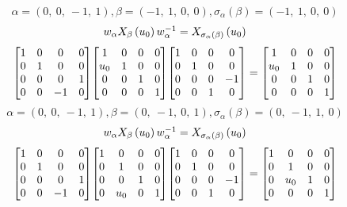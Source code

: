 \documentclass[11pt]{article}
\theoremstyle{definition}
\begin{document}
\[
\alpha = \left( 0, \  0, \  -1, \  1\right), \beta = \left( -1, \  1, \  0, \  0\right), \sigma_{\alpha}(\beta) = \left( -1, \  1, \  0, \  0\right)
\]
\[
\scaletoalign{\textwidth}{w_{\alpha} X_{\beta}\left(u_{0}\right) w_{\alpha}^{-1} = X_{\sigma_{\alpha}\left(\beta\right)}\left(u_{0}\right)}
\]
\[
\scaletoalign{\textwidth}{{\left[\begin{matrix}1 & 0 & 0 & 0\\0 & 1 & 0 & 0\\0 & 0 & 0 & 1\\0 & 0 & -1 & 0\end{matrix}\right]} {\left[\begin{matrix}1 & 0 & 0 & 0\\u_{0} & 1 & 0 & 0\\0 & 0 & 1 & 0\\0 & 0 & 0 & 1\end{matrix}\right]} {\left[\begin{matrix}1 & 0 & 0 & 0\\0 & 1 & 0 & 0\\0 & 0 & 0 & -1\\0 & 0 & 1 & 0\end{matrix}\right]} = {\left[\begin{matrix}1 & 0 & 0 & 0\\u_{0} & 1 & 0 & 0\\0 & 0 & 1 & 0\\0 & 0 & 0 & 1\end{matrix}\right]}}
\]
\[
\alpha = \left( 0, \  0, \  -1, \  1\right), \beta = \left( 0, \  -1, \  0, \  1\right), \sigma_{\alpha}(\beta) = \left( 0, \  -1, \  1, \  0\right)
\]
\[
\scaletoalign{\textwidth}{w_{\alpha} X_{\beta}\left(u_{0}\right) w_{\alpha}^{-1} = X_{\sigma_{\alpha}\left(\beta\right)}\left(u_{0}\right)}
\]
\[
\scaletoalign{\textwidth}{{\left[\begin{matrix}1 & 0 & 0 & 0\\0 & 1 & 0 & 0\\0 & 0 & 0 & 1\\0 & 0 & -1 & 0\end{matrix}\right]} {\left[\begin{matrix}1 & 0 & 0 & 0\\0 & 1 & 0 & 0\\0 & 0 & 1 & 0\\0 & u_{0} & 0 & 1\end{matrix}\right]} {\left[\begin{matrix}1 & 0 & 0 & 0\\0 & 1 & 0 & 0\\0 & 0 & 0 & -1\\0 & 0 & 1 & 0\end{matrix}\right]} = {\left[\begin{matrix}1 & 0 & 0 & 0\\0 & 1 & 0 & 0\\0 & u_{0} & 1 & 0\\0 & 0 & 0 & 1\end{matrix}\right]}}
\]
\end{document}
